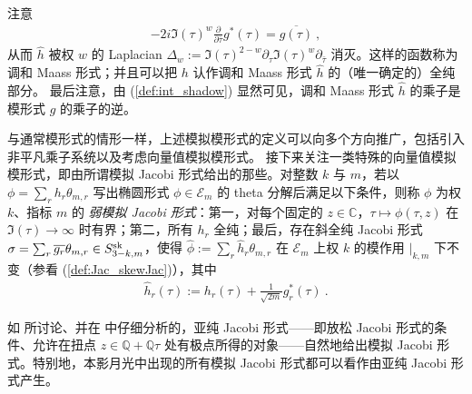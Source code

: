 \documentclass[11pt,a4paper,fontset=windows]{ctexart}
\numberwithin{equation}{section}
\newcommand{\CC}{\mathbb{C}}
\newcommand{\QQ}{\mathbb{Q}}
\newcommand{\E}{\mathcal{E}}
\def\pa{\partial}
\def\s{\sigma}
\def\t{\tau}
\def\th{\theta}
\newcommand{\sk}{{\rm sk}}
\newcommand{\eq}[1]{(\ref{#1})}
\begin{document}
注意
\begin{gather}\label{eqn:jac:mck-partialgstargbar}
-2i\Im(\t)^w\frac{\pa}{\pa \bar \tau} g^\ast(\t) =  
\overline{g(\t)}~, 
\end{gather}
从而 $\hat h$ 被权 $w$ 的 Laplacian $\Delta_w := \Im(\t)^{2-w} \pa_\t \Im(\t)^w \pa_{\bar\t}$ 消灭。这样的函数称为调和 Maass 形式；并且可以把 $h$ 认作调和 Maass 形式 $\hat h$ 的（唯一确定的）全纯部分。
最后注意，由 (\ref{def:int_shadow}) 显然可见，调和 Maass 形式 $\hat h$ 的乘子是模形式 $g$ 的乘子的逆。


与通常模形式的情形一样，上述模拟模形式的定义可以向多个方向推广，包括引入非平凡乘子系统以及考虑向量值模拟模形式。
接下来关注一类特殊的向量值模拟模形式，即由所谓模拟 Jacobi 形式给出的那些。对整数 $k$ 与 $m$，若以 $\phi=\sum_r {h}_r\th_{m,r}$ 写出椭圆形式 $\phi\in\E_m$ 的 theta 分解后满足以下条件，则称 $\phi$ 为权 $k$、指标 $m$ 的 {\em 弱模拟 Jacobi 形式}：第一，对每个固定的 $z\in\CC$，$\tau\mapsto \phi(\t,z)$ 在 $\Im(\tau)\to \infty$ 时有界；第二，所有 $h_r$ 全纯；最后，存在斜全纯 Jacobi 形式 $\s=\sum_r \overline{g_r}\theta_{m,r}\in S^\sk_{3-k,m}$，使得 $\hat\phi:=\sum_r\hat{h}_r\th_{m,r}$ 在 $\E_m$ 上权 $k$ 的模作用 $\lvert_{k,m}$ 下不变（参看 \eq{def:Jac_skewJac}），其中
\begin{gather}\label{eqn:jac:mck-hhat}
\hat{h}_r(\t):=h_r(\t)+\frac1{\sqrt{2m}}g_r^*(\t)~. 
\end{gather}


如 \cite{Zwegers2008} 所讨论、并在 \cite{Dabholkar:2012nd,umstar} 中仔细分析的，亚纯 Jacobi 形式——即放松 Jacobi 形式的条件、允许在扭点 $z\in \QQ + \QQ \tau $ 处有极点所得的对象——自然地给出模拟 Jacobi 形式。特别地，本影月光中出现的所有模拟 Jacobi 形式都可以看作由亚纯 Jacobi 形式产生。
\end{document}
